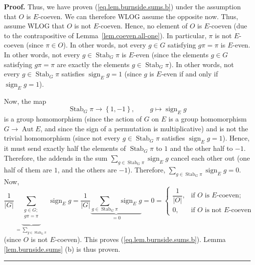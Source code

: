 \documentclass[numbers=enddot,12pt,final,onecolumn,notitlepage,abstracton]{scrartcl}%
\theoremstyle{definition}
\newenvironment{proof}[1][Proof]{\noindent\textbf{#1.} }{\ \rule{0.5em}{0.5em}}
\let\sumnonlimits\sum
\renewcommand{\sum}{\sumnonlimits\limits}
\newcommand{\sign}{\operatorname{sign}}
\newcommand{\Stab}{\operatorname{Stab}}
\begin{document}
\begin{proof}
Thus, we have proven (\ref{eq.lem.burnside.sums.b}) under the assumption that
$O$ is $E$-coeven. We can therefore WLOG assume the opposite now. Thus, assume
WLOG that $O$ is not $E$-coeven. Hence, no element of $O$ is
$E$-coeven (due to the contrapositive of Lemma~\ref{lem.coeven.all-one}).
In particular, $\pi$ is not $E$-coeven (since $\pi \in O$).
In other words, not every $g\in G$ satisfying $g\pi=\pi$ is
$E$-even. In other words, not every $g\in \Stab_G \pi$
is $E$-even (since the elements $g\in G$ satisfying $g\pi=\pi$ are exactly the
elements $g\in \Stab_G \pi$). In other words, not
every $g\in \Stab_G \pi$ satisfies
$\sign_E g = 1$ (since $g$ is $E$-even if and only if
$\sign_E g = 1$).

Now, the map
\[
 \Stab_G \pi\rightarrow\left\{  1,-1\right\}
,\ \ \ \ \ \ \ \ \ \ g \mapsto \sign_E g
\]
is a group homomorphism (since the action of $G$ on $E$ is a group
homomorphism $G \to \operatorname{Aut} E$, and since
the sign of a permutation is multiplicative)
and is not the trivial homomorphism (since not every
$g \in \Stab_G \pi$ satisfies $\sign_E g = 1$). Hence, it
must send exactly half the elements of $ \Stab_G \pi$
to $1$ and the other half to $-1$. Therefore, the addends in the sum
$\sum_{g\in \Stab_G \pi}
\sign_E g$ cancel each other out (one half of them are $1$, and the
others are $-1$). Therefore,
$\sum_{g\in \Stab_G \pi} \sign_E g = 0$. Now,
\[
\dfrac{1}{\left\vert G\right\vert }\underbrace{\sum_{\substack{g\in
G;\\g\pi=\pi}}}_{=\sum_{g\in \Stab_G \pi}}
\sign_E g
= \dfrac{1}{\left\vert G\right\vert }
\underbrace{\sum_{g\in \Stab_G \pi} \sign_E g}_{=0}
= 0
=
\begin{cases}
\dfrac{1}{\left\vert O\right\vert }, & \text{if }O\text{ is }E\text{-coeven}%
;\\
0, & \text{if }O\text{ is not }E\text{-coeven}%
\end{cases}
\]
(since $O$ is not $E$-coeven).
This proves (\ref{eq.lem.burnside.sums.b}). Lemma \ref{lem.burnside.sums} (b)
is thus proven.
\end{proof}
\end{document}
